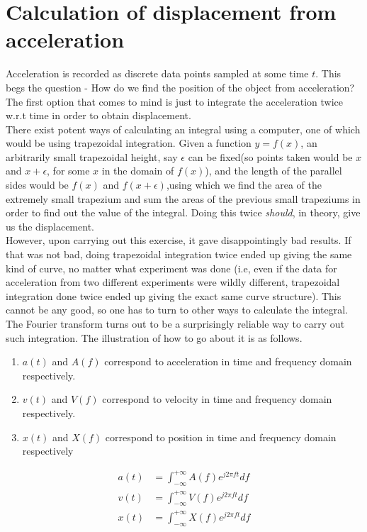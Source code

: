 \documentclass[oneside]{book}
\begin{document}
\chapter{Calculation of displacement from acceleration}
Acceleration is recorded as discrete data points sampled at some time $t$. This begs the question - How do we find the position of the object from acceleration? The first option that comes to mind is just to integrate the acceleration twice w.r.t time in order to obtain displacement.\\
\bigskip
There exist potent ways of calculating an integral using a computer, one of which would be using trapezoidal integration. Given a function $y = f(x)$, an arbitrarily small trapezoidal height, say $\epsilon$ can be fixed(so points taken would be $x$ and $x + \epsilon$, for some $x$ in the domain of $f(x)$), and the length of the parallel sides would be $f(x)$ and $f(x+\epsilon)$,using which we find the area of the extremely small trapezium and sum the areas of the previous small trapeziums in order to find out the value of the integral. Doing this twice \textit{should}, in theory, give us the displacement.\\
\bigskip
However, upon carrying out this exercise, it gave disappointingly bad results. If that was not bad, doing trapezoidal integration twice ended up giving the same kind of curve, no matter what experiment was done (i.e, even if the data for acceleration from two different experiments were wildly different, trapezoidal integration done twice ended up giving the exact same curve structure). This cannot be any good, so one has to turn to other ways to calculate the integral.\\
\bigskip 
The Fourier transform turns out to be a surprisingly reliable way to carry out such integration. The illustration of how to go about it is as follows.\\
\begin{enumerate}
    \item $a(t)$ and $A(f)$ correspond to acceleration in time and frequency domain respectively.
    \item $v(t)$ and $V(f)$ correspond to velocity in time and frequency domain respectively.
    \item $x(t)$ and $X(f)$ correspond to position in time and frequency domain respectively
\end{enumerate}
\begin{align}
    a(t) &= \int_{-\infty}^{+\infty} A(f)e^{j2\pi ft} df \label{FT_acc} \\
    v(t) &= \int_{-\infty}^{+\infty} V(f)e^{j2\pi ft} df \label{FT_vel}\\
    x(t) &= \int_{-\infty}^{+\infty} X(f)e^{j2\pi ft} df \label{FT_pos}
\end{align}
\end{document}
